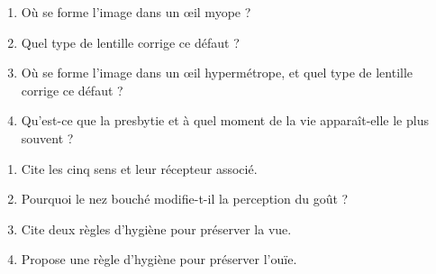 \begin{enumerate}[label=\arabic*)]
\item Où se forme l'image dans un œil myope ?
\item Quel type de lentille corrige ce défaut ?
\item Où se forme l'image dans un œil hypermétrope, et quel type de lentille corrige ce
défaut ?
\item Qu'est-ce que la presbytie et à quel moment de la vie apparaît-elle le plus
souvent ?
\end{enumerate}

\begin{enumerate}[label=\arabic*)]
\item Cite les cinq sens et leur récepteur associé.
\item Pourquoi le nez bouché modifie-t-il la perception du goût ?
\item Cite deux règles d'hygiène pour préserver la vue.
\item Propose une règle d'hygiène pour préserver l'ouïe.
\end{enumerate}

